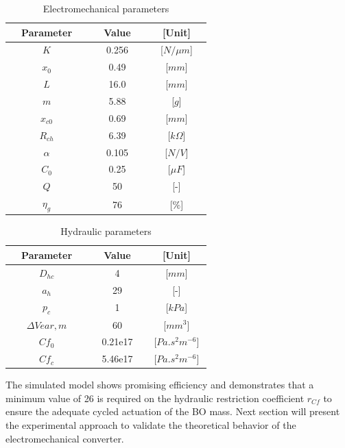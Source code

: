 \documentclass[3p,twocolumn,preprint]{elsarticle}
\begin{document}
\begin{table}	
	\centering
	\begin{tabular}{c|c|c}
\toprule
\multicolumn{1}{c}{~~\textbf{Parameter}~~}  & \multicolumn{1}{c}{~~\textbf{Value}~~} & \multicolumn{1}{c}{~~\textbf{[Unit]}~~}  \\
\midrule
$K$					&	0.256			& [$N/\mu m$]			\\ \hline
$x_0$				&	0.49			& [$mm$] 				\\ \hline
$L$					&	16.0			& [$mm$] 				\\ \hline
$m$					&	5.88			& [$g$] 				\\ \hline
$x_{c0}$			&	0.69			& [$mm$] 				\\ \hline
$R_{ch}$			&	6.39			& [$k\Omega$] 			\\ \hline
$\alpha$			&   0.105			& [$N/V$] 				\\ \hline
$C_0$	   			&	0.25			& [$\mu F$]				\\ \hline
$Q$ 				&	50				& [-] 					\\ \hline
$\eta_g$			& 	76				& [$\%$]		\\ 
\bottomrule
	\end{tabular}
	\caption{Electromechanical parameters}
	\label{tab:parametres électromécaniques}
\end{table}
\begin{table}
	\centering
	\begin{tabular}{c|c|c}
\toprule
\multicolumn{1}{c}{~~\textbf{Parameter}~~}  & \multicolumn{1}{c}{~~\textbf{Value}~~} & \multicolumn{1}{c}{~~\textbf{[Unit]}~~}  \\
\midrule
$D_{hc}$  	   			&	4				& [$mm$]			\\ \hline
$a_h$					&	29				& [-]				\\ \hline
$p_c$					&	1				& [$kPa$]			\\ \hline
$\Delta V{ear,m}$		& 60				& [$mm^3$]			\\ \hline
$Cf_0$					&	0.21e17			&[$Pa.s^2m^{-6}$]	\\ \hline
$Cf_c$					&	5.46e17			&[$Pa.s^2m^{-6}$]	\\
\bottomrule 
	\end{tabular}
	\caption{Hydraulic parameters}
	\label{tab:parametres_hydrauliques}
\end{table}

The simulated model shows promising efficiency and demonstrates that a minimum value of 26 is required on the hydraulic restriction coefficient $r_{Cf}$ to ensure the adequate cycled actuation of the BO mass. Next section will present the experimental approach to validate the theoretical behavior of the electromechanical converter.
\end{document}
